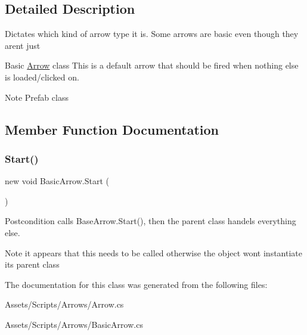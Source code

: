 \subsection{Detailed Description}
Dictates which kind of arrow \textquotesingle{}type\textquotesingle{} it is. Some arrows are basic even though they aren\textquotesingle{}t just

Basic \hyperlink{class_arrow}{Arrow} class This is a default arrow that should be fired when nothing else is loaded/clicked on. \begin{DoxyNote}{Note}
Prefab class 
\end{DoxyNote}


\subsection{Member Function Documentation}
\mbox{\label{class_basic_arrow_a17d5a6491f2ce81238738282ad62d8ea}} 
\subsubsection{\texorpdfstring{Start()}{Start()}}
{\footnotesize\ttfamily new void Basic\+Arrow.\+Start (\begin{DoxyParamCaption}{ }\end{DoxyParamCaption})\hspace{0.3cm}{\ttfamily [private]}}

\begin{DoxyPostcond}{Postcondition}
calls Base\+Arrow.\+Start(), then the parent class handels everything else. 
\end{DoxyPostcond}
\begin{DoxyNote}{Note}
it appears that this needs to be called otherwise the object won\textquotesingle{}t instantiate it\textquotesingle{}s parent class 
\end{DoxyNote}


The documentation for this class was generated from the following files\+:\begin{DoxyCompactItemize}
\item 
Assets/\+Scripts/\+Arrows/Arrow.\+cs\item 
Assets/\+Scripts/\+Arrows/Basic\+Arrow.\+cs\end{DoxyCompactItemize}
